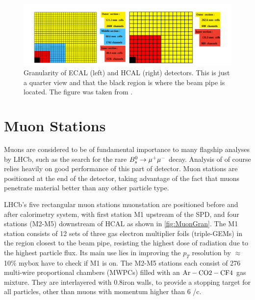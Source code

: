 \begin{figure}[!h]
	\centering
	\includegraphics[width = 1.0\textwidth]{figs/detector/CaloGran.png}%
	\caption{Granularity of \Gls{ECAL} (left) and \Gls{HCAL} (right) detectors. This is just a quarter view and that the black region is where the beam pipe is located. The figure was taken from \cite{det_paper}. }  
	\label{fig:CaloGran}
\end{figure}




\section{Muon Stations }
\label{muonsys}
Muons are considered to be of fundamental importance to many flagship analyses by \Gls{LHCb}, such as the search for the rare ${B}^{0}_{s} \rightarrow \mu^{+} \mu^{-}$ decay\cite{Aaij:2017vad}. Analysis of \Bmumumu of course relies heavily on good performance of this part of detector. Muon stations are positioned at the end of the detector, taking advantage of the fact that muons penetrate material better than any other particle type. 

\Gls{LHCb}'s five rectangular muon stations \Gls{muonstation} are positioned before and after calorimetry system, with first station M1 upstream of the \Gls{SPD}, and four stations (M2-M5) downstream of \Gls{HCAL} as shown in \autoref{fig:MuonGran}. The M1 station consists of 12 sets of three gas electron 
multiplier foils (triple-GEMs) in the region closest to the beam pipe, resisting the highest dose of radiation due to the highest particle flux. Its main use lies in improving the $p_{T}$ resolution by $\approx$ 10\% mybox{\color{red} have to check if M1 is on}. The M2-M5 stations each consist of 276 multi-wire proportional chambers (\Gls{MWPCs}) filled with an $\rm{Ar-CO2-CF4}$ gas mixture. They are interlayered with 0.8\m iron walls, to provide a stopping target for all particles, other than muons with momentum higher than $6$ \gev/c.


